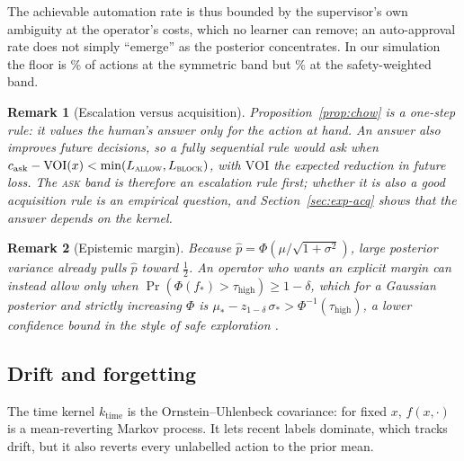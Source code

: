\documentclass[11pt]{article}
\newtheorem{remark}{Remark}
\begin{document}
The achievable automation rate is thus bounded by the supervisor's own
ambiguity at the operator's costs, which no learner can remove; an
auto-approval rate does not simply ``emerge'' as the posterior concentrates.
In our simulation the floor is \resFloorSym\% of actions at the symmetric
band but \resFloorSafe\% at the safety-weighted band.

\begin{remark}[Escalation versus acquisition]\label{rem:voi}
Proposition~\ref{prop:chow} is a one-step rule: it values the human's answer
only for the action at hand. An answer also improves future decisions, so a
fully sequential rule would ask when $c_{\text{ask}} - \mathrm{VOI}(x) <
\min(L_{\textsc{allow}}, L_{\textsc{block}})$, with $\mathrm{VOI}$ the expected
reduction in future loss. The \textsc{ask} band is therefore an escalation
rule first; whether it is also a good acquisition rule is an empirical
question, and Section~\ref{sec:exp-acq} shows that the answer depends on the
kernel.
\end{remark}

\begin{remark}[Epistemic margin]\label{rem:margin}
Because $\hat p = \Phi(\mu/\sqrt{1+\sigma^2})$, large posterior variance
already pulls $\hat p$ toward $\tfrac12$. An operator who wants an explicit
margin can instead allow only when $\Pr(\Phi(f_*) > \tau_{\text{high}}) \ge
1-\delta$, which for a Gaussian posterior and strictly increasing $\Phi$ is
$\mu_* - z_{1-\delta}\,\sigma_* > \Phi^{-1}(\tau_{\text{high}})$, a lower
confidence bound in the style of safe exploration \citep{sui2015safe}.
\end{remark}

\subsection{Drift and forgetting}\label{sec:nonstationary}

The time kernel $k_{\text{time}}$ is the Ornstein--Uhlenbeck covariance: for
fixed $x$, $f(x,\cdot)$ is a mean-reverting Markov process. It lets recent
labels dominate, which tracks drift, but it also reverts every unlabelled
action to the prior mean.
\end{document}
